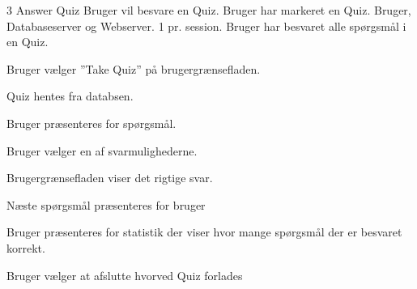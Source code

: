 \uchead
	{3}
	{Answer Quiz}
	{Bruger vil besvare en Quiz.}
	{Bruger har markeret en Quiz.}
	{Bruger, Databaseserver og Webserver.}
	{}
	{1 pr. session.}
	{Bruger har besvaret alle spørgsmål i en Quiz.}

\item Bruger vælger ''Take Quiz'' på brugergrænsefladen.

\item Quiz hentes fra databsen.

\item\label{ucAnswerQuizPresent} Bruger præsenteres for spørgsmål.

\item Bruger vælger en af svarmulighederne. 

\item Brugergrænsefladen viser det rigtige svar.

\item\label{ucAnswerQuizEnd} Næste spørgsmål præsenteres for bruger 

\item Bruger præsenteres for statistik der viser hvor mange spørgsmål der er besvaret korrekt.

\item Bruger vælger at afslutte hvorved Quiz forlades

\ucdescriptionend
{}